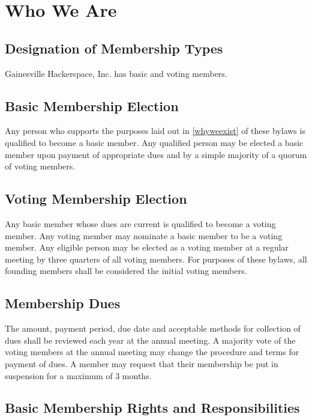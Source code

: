 \documentclass[10pt,letterpaper,titlepage]{article}
\newcommand\corpname{Gainesville Hackerspace, Inc.}
\begin{document}
\section{Who We Are}

\subsection{Designation of Membership Types}

\corpname{} has basic and voting members.

\subsection{Basic Membership Election}

Any person who supports the purposes laid out in \ref{whyweexist} of
these bylaws is qualified to become a basic member.  Any qualified person
may be elected a basic member upon payment of appropriate dues and by a simple
majority of a quorum of voting members.


\subsection{Voting Membership Election}

Any basic member whose dues are current is qualified to become a voting
member. Any voting member may nominate a basic member to be a voting
member. Any eligible person may be elected as a voting member at a
regular meeting by three quarters of all voting members.
For purposes of these bylaws, all founding members shall be considered
the initial voting members.


\subsection{Membership Dues}
\label{votmemdue}

The amount, payment period, due date and acceptable methods for collection of
dues shall be reviewed each year at the annual meeting.
A majority vote of the voting members at the annual meeting may change the procedure
and terms for payment of dues.
A member may request that their membership be put in suspension for a maximum
of 3 months.

\subsection{Basic Membership Rights and Responsibilities}
\end{document}

